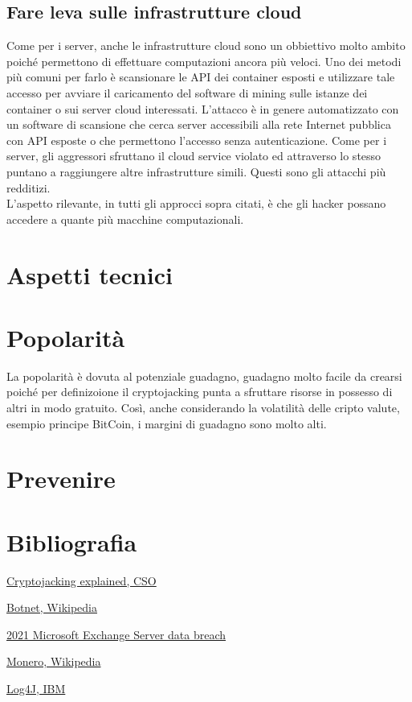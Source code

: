 \documentclass[12pt,a4paper]{article}
\begin{document}
\subsection{Fare leva sulle infrastrutture cloud}
Come per i server, anche le infrastrutture cloud sono un obbiettivo molto ambito
poiché permettono di effettuare computazioni ancora più veloci. Uno dei metodi
più comuni per farlo è scansionare le API dei container esposti e utilizzare
tale accesso per avviare il caricamento del software di mining sulle istanze dei
container o sui server cloud interessati. L'attacco è in genere automatizzato
con un software di scansione che cerca server accessibili alla rete Internet
pubblica con API esposte o che permettono l'accesso senza autenticazione. Come
per i server, gli aggressori sfruttano il cloud service violato ed attraverso lo
stesso puntano a raggiungere altre infrastrutture simili.
Questi sono gli attacchi più redditizi.
\\
L'aspetto rilevante, in tutti gli approcci sopra citati, è che gli hacker possano 
accedere a quante più macchine computazionali.

\section{Aspetti tecnici}

\section{Popolarità}
La popolarità è dovuta al potenziale guadagno, guadagno molto facile da crearsi
poiché per definizoione il cryptojacking punta a sfruttare risorse in possesso
di altri in modo gratuito. Così, anche considerando la volatilità delle cripto
valute, esempio principe BitCoin, i margini di guadagno sono molto alti.

\section{Prevenire}

\section{Bibliografia}
\begin{thebibliography}{9}

\href{https://arc.net/l/quote/karbftmg}{Cryptojacking explained, CSO}

\href{https://arc.net/l/quote/ftyxgxms}{Botnet, Wikipedia}

\href{https://arc.net/l/quote/golshtco}{2021 Microsoft Exchange Server data breach}

\href{https://arc.net/l/quote/jffmkeln}{Monero, Wikipedia}

\href{https://arc.net/l/quote/zjujxamu}{Log4J, IBM}


\end{thebibliography}
\end{document}
